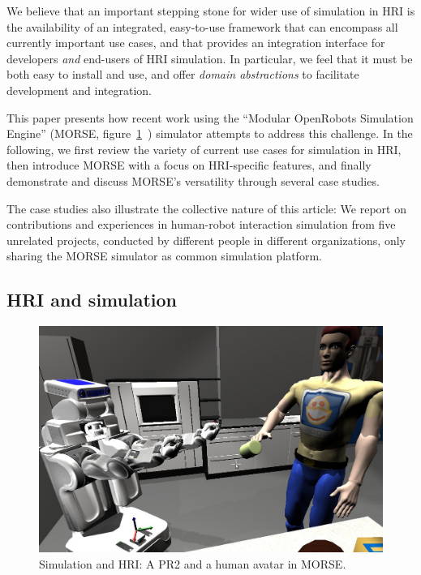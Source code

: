 \documentclass{llncs}
\begin{document}
We believe that an important stepping stone for wider use of simulation in HRI
is the availability of an integrated, easy-to-use framework that can encompass
all currently important use cases, and that provides an integration interface 
for developers \emph{and} end-users of HRI simulation.  In particular, we feel
that it must be both easy to install and use, and offer \emph{domain 
abstractions} to facilitate development and integration.

This paper presents how recent work using the ``Modular OpenRobots Simulation
Engine'' (MORSE, figure~\ref{fig|morse-hri}~\cite{morse_simpar_2012}) simulator
attempts to address this challenge. In the following, we first review the variety of 
current use cases for simulation in HRI, then introduce MORSE with a focus on 
HRI-specific features, and finally demonstrate and discuss MORSE's versatility
through several case studies. 

The case studies also illustrate the collective nature
of this article: We report on contributions and experiences in human-robot interaction
simulation from five unrelated projects, conducted by different people in
different organizations, only sharing the MORSE simulator
as common simulation platform. 


\subsection*{HRI and simulation}

\begin{figure}[t]
      \centering 
      \includegraphics[width=0.7\linewidth]{morse_pr2.jpg}
      \caption{Simulation and HRI: A PR2 and a human avatar in MORSE.}
      \label{fig|morse-hri}
\end{figure}
\end{document}
